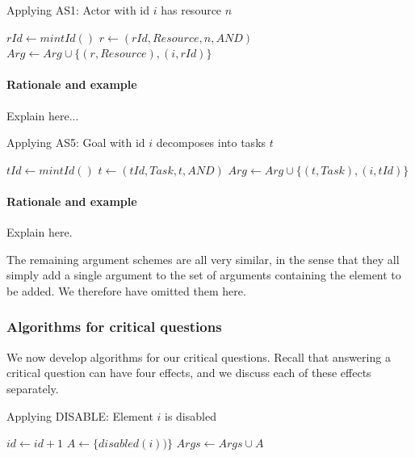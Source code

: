 \begin{algorithm}[h]
  \caption{Applying AS1: Actor with id $i$ has resource $n$}\label{alg:as1}
  \begin{algorithmic}[1]
    \State $rId\gets mintId()$
    \State $r\leftarrow (rId, Resource, n, AND)$
    \State $Arg\gets Arg\cup \{(r, Resource),(i,rId)\}$
    \EndProcedure
  \end{algorithmic}
\end{algorithm}

\paragraph{Rationale and example} Explain here...

\begin{algorithm}[h]
  \caption{Applying AS5: Goal with id $i$ decomposes into tasks $t$}\label{alg:as5}
  \begin{algorithmic}[1]
    \State $tId\gets mintId()$
    \State $t\leftarrow (tId, Task, t, AND)$
    \State $Arg\gets Arg\cup \{(t, Task),(i,tId)\}$
    \EndProcedure
  \end{algorithmic}
\end{algorithm}

\paragraph{Rationale and example} Explain here.


The remaining argument schemes are all very similar, in the sense that they all simply add a single argument to the set of arguments containing the element to be added. We therefore have omitted them here.

\subsubsection*{Algorithms for critical questions}

We now develop algorithms for our critical questions. Recall that answering a critical question can have four effects, and we discuss each of these effects separately.

\begin{algorithm}[h]
  \caption{Applying DISABLE: Element $i$ is disabled}\label{alg:disable}
  \begin{algorithmic}[1]
    \State $id\gets id+1$
    \State $A\gets \{disabled(i))\}$
    \State $Args \gets Args\cup A$
    \EndProcedure
  \end{algorithmic}
\end{algorithm}

